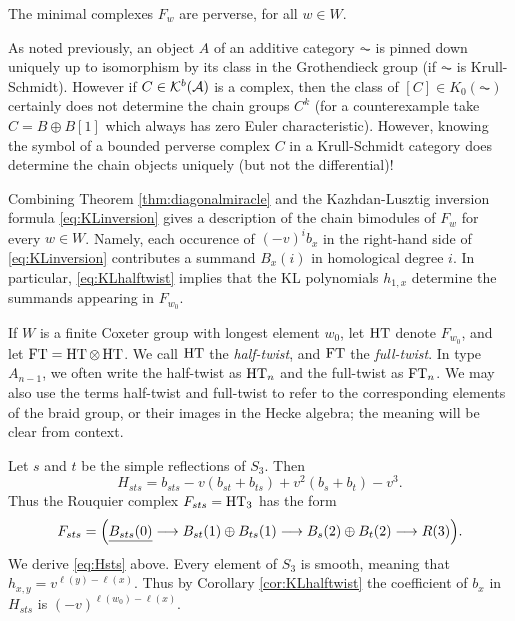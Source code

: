 \begin{thm}\label{thm:diagonalmiracle}
The minimal complexes $F_w$ are perverse, for all $w \in W$.
\end{thm}


As noted previously, an object $A$ of an additive category $\AC$ is pinned down uniquely up to isomorphism by its class in the Grothendieck group (if $\AC$ is Krull-Schmidt).  However if $C\in {\mathcal{K}}^b({\mathcal{A}})$ is a complex, then the class of $[C]\in K_0(\AC)$ certainly does not determine the chain groups $C^k$ (for a counterexample take $C=B\oplus B[1]$ which always has zero Euler characteristic).  However, knowing the symbol of a bounded perverse complex $C$ in a Krull-Schmidt category does determine the chain objects uniquely (but not the differential)! 

Combining Theorem \ref{thm:diagonalmiracle} and the Kazhdan-Lusztig inversion formula \eqref{eq:KLinversion} gives a description of the chain bimodules of $F_w$ for every $w\in W$.  Namely, each occurence of $(-v)^i b_x$ in the right-hand side of \eqref{eq:KLinversion} contributes a summand $B_x(i)$ in homological degree $i$.   In particular, \eqref{eq:KLhalftwist} implies that the KL polynomials $h_{1,x}$ determine the summands appearing in $F_{w_0}$.



\begin{defn}\label{def:HTandFT} If $W$ is a finite Coxeter group with longest element $w_0$, let $\operatorname{HT}$ denote $F_{w_0}$, and let $\operatorname{FT}=\operatorname{HT} \otimes \operatorname{HT}$. We call $\operatorname{HT}$ the \emph{half-twist},
and $\operatorname{FT}$ the \emph{full-twist}. In type $A_{n-1}$, we often write the half-twist as $\operatorname{HT}_n$ and the full-twist as $\operatorname{FT}_n$. We may also use the terms half-twist and full-twist to refer
to the corresponding elements of the braid group, or their images in the Hecke algebra; the meaning will be clear from context. \end{defn}




\begin{example} Let $s$ and $t$ be the simple reflections of $S_3$. Then \begin{equation} \label{eq:Hsts} H_{sts} = b_{sts} - v(b_{st}+b_{ts}) + v^2(b_s+b_t) - v^3.\end{equation} Thus the Rouquier complex $F_{sts} = \operatorname{HT}_3$ has the form
\[ F_{sts} = \Big( \underline{B_{sts}(0)} \longrightarrow B_{st}(1) \oplus B_{ts}(1) \longrightarrow B_s(2) \oplus B_t(2) \longrightarrow R(3) \Big). \]
We derive \eqref{eq:Hsts} above. Every element of $S_3$ is smooth, meaning that $h_{x,y} = v^{\ell(y)-\ell(x)}$. Thus by Corollary \ref{cor:KLhalftwist} the coefficient of $b_x$ in $H_{sts}$ is $(-v)^{\ell(w_0) - \ell(x)}$. \end{example}


